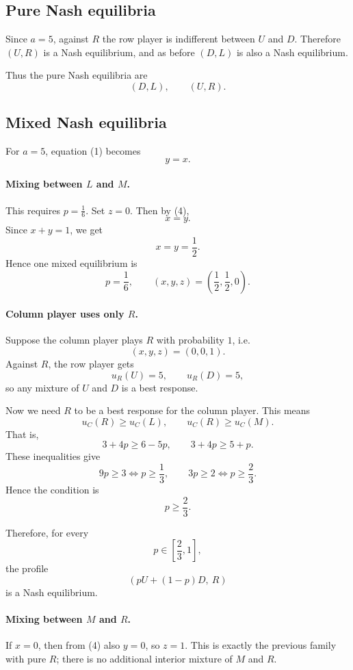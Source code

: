\subsection*{Pure Nash equilibria}

Since \(a=5\), against \(R\) the row player is indifferent between \(U\) and \(D\). Therefore \((U,R)\) is a Nash equilibrium, and as before \((D,L)\) is also a Nash equilibrium.

Thus the pure Nash equilibria are
\[
(D,L),\qquad (U,R).
\]

\subsection*{Mixed Nash equilibria}

For \(a=5\), equation (1) becomes
\[
y=x. \tag{4}
\]

\paragraph{Mixing between \(L\) and \(M\).}
This requires \(p=\frac16\). Set \(z=0\). Then by (4),
\[
x=y.
\]
Since \(x+y=1\), we get
\[
x=y=\frac12.
\]
Hence one mixed equilibrium is
\[
p=\frac16,\qquad (x,y,z)=\left(\frac12,\frac12,0\right).
\]

\paragraph{Column player uses only \(R\).}
Suppose the column player plays \(R\) with probability \(1\), i.e.
\[
(x,y,z)=(0,0,1).
\]
Against \(R\), the row player gets
\[
u_R(U)=5,\qquad u_R(D)=5,
\]
so any mixture of \(U\) and \(D\) is a best response.

Now we need \(R\) to be a best response for the column player. This means
\[
u_C(R)\ge u_C(L),\qquad u_C(R)\ge u_C(M).
\]
That is,
\[
3+4p \ge 6-5p,
\qquad
3+4p \ge 5+p.
\]
These inequalities give
\[
9p\ge 3 \iff p\ge \frac13,
\qquad
3p\ge 2 \iff p\ge \frac23.
\]
Hence the condition is
\[
p\ge \frac23.
\]

Therefore, for every
\[
p\in\left[\frac23,1\right],
\]
the profile
\[
\left(pU+(1-p)D,\ R\right)
\]
is a Nash equilibrium.

\paragraph{Mixing between \(M\) and \(R\).}
If \(x=0\), then from (4) also \(y=0\), so \(z=1\). This is exactly the previous family with pure \(R\); there is no additional interior mixture of \(M\) and \(R\).

